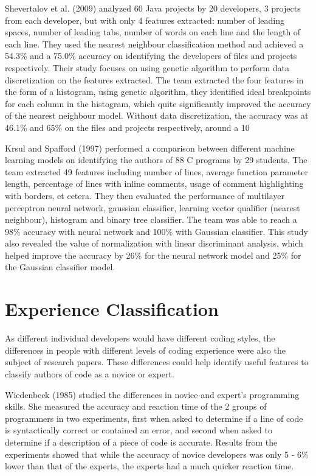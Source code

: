 \documentclass{report}
\begin{document}
Shevertalov et al. (2009) analyzed 60 Java projects by 20 developers, 3 projects from each developer, but with only 4 features extracted: number of leading spaces, number of leading tabs, number of words on each line and the length of each line. They used the nearest neighbour classification method and achieved a 54.3\% and a 75.0\% accuracy on identifying the developers of files and projects respectively. Their study focuses on using genetic algorithm to perform data discretization on the features extracted. The team extracted the four features in the form of a histogram, using genetic algorithm, they identified ideal breakpoints for each column in the histogram, which quite significantly improved the accuracy of the nearest neighbour model. Without data discretization, the accuracy was at 46.1\% and 65\% on the files and projects respectively, around a 10%

Krsul and Spafford (1997) performed a comparison between different machine learning models on identifying the authors of 88 C programs by 29 students. The team extracted 49 features including number of lines, average function parameter length, percentage of lines with inline comments, usage of comment highlighting with borders, et cetera. They then evaluated the performance of multilayer perceptron neural network, gaussian classifier, learning vector qualifier (nearest neighbour), histogram and binary tree classifier. The team was able to reach a 98\% accuracy with neural network and 100\% with Gaussian classifier. This study also revealed the value of normalization with linear discriminant analysis, which helped improve the accuracy by 26\% for the neural network model and 25\% for the Gaussian classifier model.

\section{Experience Classification}

As different individual developers would have different coding styles, the differences in people with different levels of coding experience were also the subject of research papers. These differences could help identify useful features to classify authors of code as a novice or expert.

Wiedenbeck (1985) studied the differences in novice and expert’s programming skills. She measured the accuracy and reaction time of the 2 groups of programmers in two experiments, first when asked to determine if a line of code is syntactically correct or contained an error, and second when asked to determine if a description of a piece of code is accurate. Results from the experiments showed that while the accuracy of novice developers was only 5 - 6\% lower than that of the experts, the experts had a much quicker reaction time.
\end{document}
